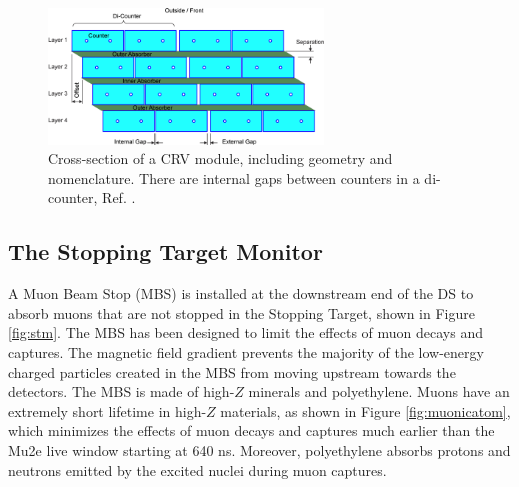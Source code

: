\begin{figure}[!h]
\centering
\includegraphics[width =0.65\textwidth]{figures/png/Crv_module_geometry.png}
\caption[The cross-section of a CRV module.]{Cross-section of a CRV module, including geometry and nomenclature. 
There are internal gaps between counters in a di-counter, Ref. \cite{Giovannella_2020}.}
\label{fig:crvmodule}
\end{figure}
\subsection{The Stopping Target Monitor}
A Muon Beam Stop (MBS) is installed at the downstream end of the DS to 
absorb muons that are not stopped in the Stopping Target, shown in Figure \ref{fig:stm}. 
The MBS has been designed to limit the effects of muon decays and captures. 
The magnetic field gradient prevents the majority of the low-energy charged 
particles created in the MBS from moving upstream towards the detectors.  
The MBS is made of high-$Z$ minerals and polyethylene. Muons have an extremely short lifetime in 
high-$Z$ materials, as shown in Figure \ref{fig:muonicatom}, which minimizes the effects of muon 
decays and captures much earlier than the Mu2e live window starting at 640 ns. Moreover, polyethylene 
absorbs protons and neutrons emitted by the excited nuclei during muon captures.  

